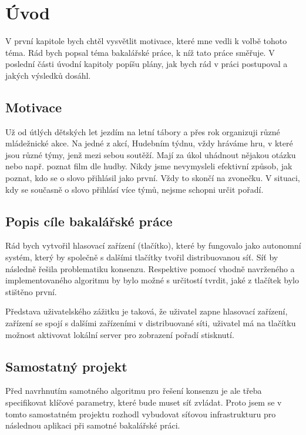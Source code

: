 

\chapter{Úvod}

V první kapitole bych chtěl vysvětlit motivace, které mne vedli k volbě tohoto téma. Rád bych popsal téma bakalářské práce, k níž tato práce směřuje. V poslední části úvodní kapitoly popíšu plány, jak bych rád v práci postupoval a jakých výsledků dosáhl.

\section{Motivace}

Už od útlých dětských let jezdím na letní tábory a přes rok organizuji různé mládežnické akce. Na jedné z akcí, Hudebním týdnu, vždy hráváme hru, v které jsou různé týmy, jenž mezi sebou soutěží. Mají za úkol uhádnout nějakou otázku nebo např. poznat film dle hudby. Nikdy jsme nevymysleli efektivní způsob, jak poznat, kdo se o slovo přihlásil jako první. Vždy to skončí na zvonečku. V situaci, kdy se současně o slovo přihlásí více týmů, nejsme schopni určit pořadí.

\section{Popis cíle bakalářské práce}

Rád bych vytvořil hlasovací zařízení (tlačítko), které by fungovalo jako autonomní systém, který by společně s dalšími tlačítky tvořil distribuovanou síť. Síť by následně řešila problematiku konsenzu. Respektive pomocí vhodně navrženého a implementovaného algoritmu by bylo možné s určitostí tvrdit, jaké z tlačítek bylo stištěno první.

Představa uživatelského zážitku je taková, že uživatel zapne hlasovací zařízení, zařízení se spojí s dalšími zařízeními v distribuované síti, uživatel má na tlačítku možnost aktivovat lokální server pro zobrazení pořadí stisknutí.

\section{Samostatný projekt}

Před navrhnutím samotného algoritmu pro řešení konsenzu je ale třeba specifikovat klíčové parametry, které bude muset síť zvládat. Proto jsem se v tomto samostatném projektu rozhodl vybudovat síťovou infrastrukturu pro následnou aplikaci při samotné bakalářské práci.


